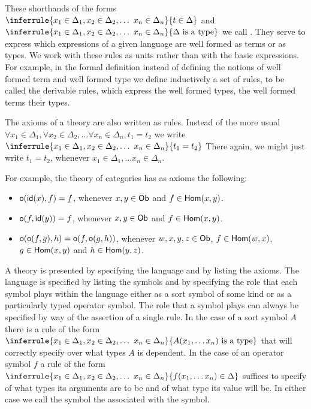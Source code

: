 These shorthands of the forms
%
$\inferrule
{ x_1 \in \Delta_1, x_2 \in \Delta_2, \ldots\ x_n \in \Delta_n }
{ t \in \Delta } $
%
and
%
$\inferrule
{ x_1 \in \Delta_1, x_2 \in \Delta_2, \ldots\ x_n \in \Delta_n }
{ \Delta \isatype } $
%
we call .
%
They serve to express which expressions of a given language are well formed as terms or as types.
%
We work with these rules as units rather than with the basic expressions.
%
For example, in the formal definition instead of defining the notions of well formed term and well formed type we define inductively a set of rules, to be called the derivable rules, which express the well formed types, the well formed terms their types.

The axioms of a theory are also written as rules.
%
Instead of the more usual $\forall x_1 \in \Delta_1, \forall x_2 \in \Delta_2, \ldots \forall x_n \in \Delta_n, t_1 = t_2$ we write
%
$\inferrule
{ x_1 \in \Delta_1, x_2 \in \Delta_2, \ldots\ x_n \in \Delta_n }
{ t_1 = t_2 } $
%
There again, we might just write $t_1 = t_2$, whenever $x_1 \in \Delta_1, \ldots x_n \in \Delta_n$.

For example, the theory of categories has as axioms the following:
%
\begin{itemize}
  \item $\mathsf{o}(\mathsf{id}(x),f) = f$, whenever $x,y \in \mathsf{Ob}$ and $f \in \mathsf{Hom}(x,y)$.
  \item $\mathsf{o}(f,\mathsf{id}(y)) = f$, whenever $x,y \in \mathsf{Ob}$ and $f \in \mathsf{Hom}(x,y)$.
  \item $\mathsf{o}(\mathsf{o}(f,g),h) = \mathsf{o}(f,\mathsf{o}(g,h))$, whenever $w,x,y,z \in \mathsf{Ob}$, $f \in \mathsf{Hom}(w,x)$, $g \in \mathsf{Hom}(x,y)$ and $h \in \mathsf{Hom}(y,z)$.
\end{itemize}


A theory is presented by specifying the language and by listing the axioms.
%
The language is specified by listing the symbols and by specifying the role that each symbol plays within the language either as a sort symbol of some kind or as a particularly typed operator symbol.
%
The role that a symbol plays can always be specified by way of the assertion of a single rule.
%
In the case of a sort symbol $A$ there is a rule of the form
%
$\inferrule
{ x_1 \in \Delta_1, x_2 \in \Delta_2, \ldots\ x_n \in \Delta_n }
{ A(x_1,\ldots x_n) \isatype } $
%
that will correctly specify over what types $A$ is dependent.
%
In the case of an operator symbol $f$ a rule of the form
%
$\inferrule
{ x_1 \in \Delta_1, x_2 \in \Delta_2, \ldots\ x_n \in \Delta_n }
{ f(x_1,\ldots x_n) \in \Delta } $
%
suffices to specify of what types its arguments are to be and of what type its value will be.
%
In either case we call the symbol the  associated with the symbol.

